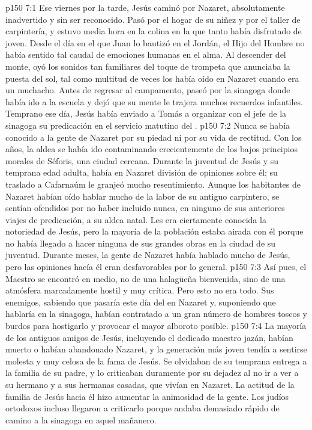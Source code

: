 \vs p150 7:1 Ese viernes por la tarde, Jesús caminó por Nazaret, absolutamente inadvertido y sin ser reconocido. Pasó por el hogar de su niñez y por el taller de carpintería, y estuvo media hora en la colina en la que tanto había disfrutado de joven. Desde el día en el que Juan lo bautizó en el Jordán, el Hijo del Hombre no había sentido tal caudal de emociones humanas en el alma. Al descender del monte, oyó los sonidos tan familiares del toque de trompeta que anunciaba la puesta del sol, tal como multitud de veces los había oído en Nazaret cuando era un muchacho. Antes de regresar al campamento, paseó por la sinagoga donde había ido a la escuela y dejó que su mente le trajera muchos recuerdos infantiles. Temprano ese día, Jesús había enviado a Tomás a organizar con el jefe de la sinagoga su predicación en el servicio matutino del .
\vs p150 7:2 Nunca se había conocido a la gente de Nazaret por su piedad ni por su vida de rectitud. Con los años, la aldea se había ido contaminando crecientemente de los bajos principios morales de Séforis, una ciudad cercana. Durante la juventud de Jesús y su temprana edad adulta, había en Nazaret división de opiniones sobre él; su traslado a Cafarnaúm le granjeó mucho resentimiento. Aunque los habitantes de Nazaret habían oído hablar mucho de la labor de su antiguo carpintero, se sentían ofendidos por no haber incluido nunca, en ninguno de sus anteriores viajes de predicación, a su aldea natal. Les era ciertamente conocida la notoriedad de Jesús, pero la mayoría de la población estaba airada con él porque no había llegado a hacer ninguna de sus grandes obras en la ciudad de su juventud. Durante meses, la gente de Nazaret había hablado mucho de Jesús, pero las opiniones hacía él eran desfavorables por lo general.
\vs p150 7:3 Así pues, el Maestro se encontró en medio, no de una halagüeña bienvenida, sino de una atmósfera marcadamente hostil y muy crítica. Pero esto no era todo. Sus enemigos, sabiendo que pasaría este día del  en Nazaret y, suponiendo que hablaría en la sinagoga, habían contratado a un gran número de hombres toscos y burdos para hostigarlo y provocar el mayor alboroto posible.
\vs p150 7:4 La mayoría de los antiguos amigos de Jesús, incluyendo el dedicado maestro jazán, habían muerto o habían abandonado Nazaret, y la generación más joven tendía a sentirse molesta y muy celosa de la fama de Jesús. Se olvidaban de su temprana entrega a la familia de su padre, y lo criticaban duramente por su dejadez al no ir a ver a su hermano y a sus hermanas casadas, que vivían en Nazaret. La actitud de la familia de Jesús hacia él hizo aumentar la animosidad de la gente. Los judíos ortodoxos incluso llegaron a criticarlo porque andaba demasiado rápido de camino a la sinagoga en aquel  mañanero.

